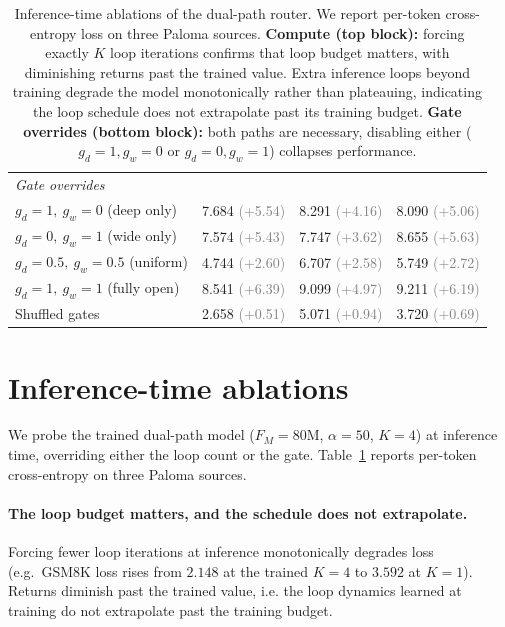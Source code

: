 \documentclass[11pt]{article}
\newcommand{\ssub}[1]{{\scriptsize\textcolor{gray}{(#1)}}}
\begin{document}
\begin{table}[t]
\begin{tabular}{l r r r}
\midrule
\multicolumn{4}{l}{\emph{Gate overrides}} \\
\quad $g_d{=}1,\ g_w{=}0$ (deep only)      & 7.684 \ssub{+5.54}   & 8.291 \ssub{+4.16}   & 8.090 \ssub{+5.06}   \\
\quad $g_d{=}0,\ g_w{=}1$ (wide only)      & 7.574 \ssub{+5.43}   & 7.747 \ssub{+3.62}   & 8.655 \ssub{+5.63}   \\
\quad $g_d{=}0.5,\ g_w{=}0.5$ (uniform)    & 4.744 \ssub{+2.60}   & 6.707 \ssub{+2.58}   & 5.749 \ssub{+2.72}   \\
\quad $g_d{=}1,\ g_w{=}1$ (fully open)     & 8.541 \ssub{+6.39}   & 9.099 \ssub{+4.97}   & 9.211 \ssub{+6.19}   \\
\quad Shuffled gates                       & 2.658 \ssub{+0.51}   & 5.071 \ssub{+0.94}   & 3.720 \ssub{+0.69}   \\
\bottomrule
\end{tabular}
\caption{%
Inference-time ablations of the dual-path router. We report per-token
cross-entropy loss on three Paloma sources. \textbf{Compute (top block):}
forcing exactly $K$ loop iterations confirms that loop budget matters,
with diminishing returns past the trained value. Extra inference loops beyond training degrade
the model monotonically rather than plateauing, indicating the loop schedule does not extrapolate past its training budget. \textbf{Gate overrides (bottom block):} both paths are necessary, disabling either ($g_d{=}1,g_w{=}0$ or $g_d{=}0,g_w{=}1$) collapses
performance. 
}
\label{tab:ablations}
\end{table}

\section{Inference-time ablations}
\label{sec:app:ablations}

We probe the trained dual-path model ($F_M = 80$M, $\alpha = 50$,
$K = 4$) at inference time, overriding either the loop count or
the gate.  Table~\ref{tab:ablations} reports per-token
cross-entropy on three Paloma sources.

\paragraph{The loop budget matters, and the schedule does not
extrapolate.}
Forcing fewer loop iterations at inference monotonically degrades
loss (e.g.\ GSM8K loss rises from $2.148$ at the trained $K{=}4$
to $3.592$ at $K{=}1$).  Returns diminish past the trained value, i.e. the loop dynamics learned at training do not extrapolate past the training budget. 
\end{document}
